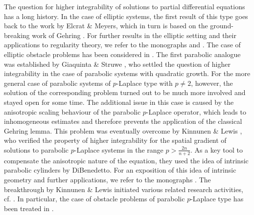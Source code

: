 \documentclass[a4paper, 10pt, american]{amsart}
\numberwithin{theorem}{section}
\numberwithin{equation}{section}
\begin{document}
The question for higher integrability of solutions to partial
differential equations has a long history.
In the case of elliptic systems, the first result of this type goes
back to the work \cite{Meyers-Elcrat} by  Elcrat \& Meyers, which in
turn is based on the
ground-breaking work of Gehring \cite{Gehring}. For further results in
the elliptic setting 
and their applications to regularity theory, we refer to the monographs 
\cite[Chapter~V, Theorem 2.1]{Giaquinta:book} and \cite[Section
6.4]{Giusti:book}. The case of elliptic obstacle problems has been
considered in \cite{Eleuteri:2007,EleuteriHabermann:2008}.
The first parabolic analogue was established by Giaquinta \&
Struwe \cite[Theorem 2.1]{Giaquinta-Struwe}, who settled the question
of higher integrability in the case of 
parabolic systems with quadratic growth. For the more general case of
parabolic systems of
$p$-Laplace type with $p\neq2$, however, the solution of the
corresponding problem turned out to be much more involved and stayed
open for some time. The additional issue in this case is caused by the
anisotropic scaling behaviour of the parabolic $p$-Laplace operator,
which leads to inhomogeneous estimates and therefore prevents the
application of the classical Gehring lemma. This problem was 
eventually overcome by Kinnunen \& Lewis
\cite{Kinnunen-Lewis:1}, who verified the property of higher integrability for the spatial gradient of
solutions to parabolic $p$-Laplace systems in the range $p>\frac{2n}{n+2}$. 
As a key tool to compensate the anisotropic nature of the equation,
they used the idea of intrinsic parabolic cylinders by
DiBenedetto. For an exposition of this idea of intrinsic geometry and further applications,
we refer to the monographs \cite{DiBe,DBGV-book}. The breakthrough by
Kinnunen \& Lewis initiated various related research activities,
cf. \cite{AdimurthiByun:2018, Boegelein:1, Boegelein:2,Boegelein-Duzaar:1,
  Boegelein-Parviainen, Kilpelainen-Koskela, Parviainen, Parviainen-singular}. In particular, the
case of obstacle problems of parabolic $p$-Laplace type has been
treated in \cite{Boegelein-Scheven-obs}.  
\end{document}
